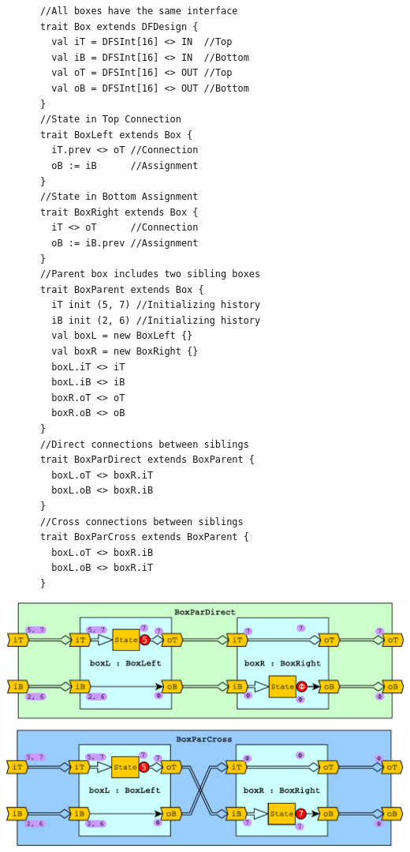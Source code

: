 \begin{table}[t!]
  \small
  \begin{minipage}[t][9cm][t]{0.343\linewidth}
    \centering
    \captionsetup{justification=centering}
    \begin{verbatim}
      //All boxes have the same interface
      trait Box extends DFDesign {
        val iT = DFSInt[16] <> IN  //Top
        val iB = DFSInt[16] <> IN  //Bottom
        val oT = DFSInt[16] <> OUT //Top
        val oB = DFSInt[16] <> OUT //Bottom
      }
      //State in Top Connection
      trait BoxLeft extends Box {
        iT.prev <> oT //Connection
        oB := iB      //Assignment
      }
      //State in Bottom Assignment
      trait BoxRight extends Box {
        iT <> oT      //Connection
        oB := iB.prev //Assignment
      }
      //Parent box includes two sibling boxes
      trait BoxParent extends Box {
        iT init (5, 7) //Initializing history
        iB init (2, 6) //Initializing history
        val boxL = new BoxLeft {}
        val boxR = new BoxRight {}
        boxL.iT <> iT
        boxL.iB <> iB
        boxR.oT <> oT
        boxR.oB <> oB
      }
      //Direct connections between siblings
      trait BoxParDirect extends BoxParent {
        boxL.oT <> boxR.iT
        boxL.oB <> boxR.iB
      }
      //Cross connections between siblings
      trait BoxParCross extends BoxParent {
        boxL.oT <> boxR.iB
        boxL.oB <> boxR.iT
      }
    \end{verbatim}
    \vfill
    \label{fig:BoxTopCode}
  \end{minipage}%
  \hfill
  \begin{minipage}[t][13cm][b]{0.64\linewidth}
    \centering
    \captionsetup{justification=centering}
    \includegraphics[width=\linewidth]{graphics/connectivity.pdf}

\end{minipage}
\end{table}
